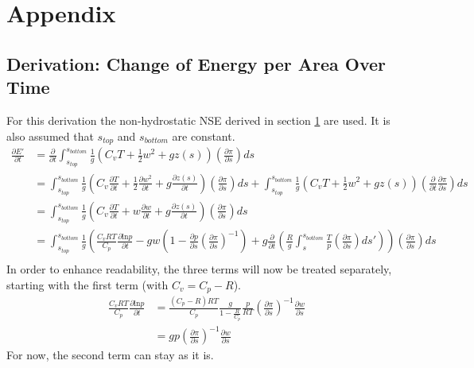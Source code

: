 \chapter{Appendix}
\section{Derivation: Change of Energy per Area Over Time}\label{sec:derivation:dE_dt}
For this derivation the non-hydrostatic NSE derived in section \ref{} are used.
It is also assumed that $s_{top}$ and $s_{bottom}$ are constant.\\
\begin{align*}
\frac{\partial E'}{\partial t} &= \frac{\partial}{\partial t}\int_{s_{top}}^{s_{bottom}} \frac{1}{g}(C_vT+\frac{1}{2}w^2 + gz(s)) \left( \frac{\partial \pi}{\partial s} \right) ds\\
&= \int_{s_{top}}^{s_{bottom}} \frac{1}{g}\left(C_v\frac{\partial T}{\partial t}+\frac{1}{2}\frac{\partial w^2}{\partial t} + g\frac{\partial z(s)}{\partial t}\right) \left( \frac{\partial \pi}{\partial s} \right) ds + \int_{s_{top}}^{s_{bottom}} \frac{1}{g}(C_vT+\frac{1}{2}w^2 + gz(s)) \left( \frac{\partial}{\partial t}\frac{\partial \pi}{\partial s} \right) ds\\
&= \int_{s_{top}}^{s_{bottom}} \frac{1}{g}\left(C_v\frac{\partial T}{\partial t}+w\frac{\partial w}{\partial t} + g\frac{\partial z(s)}{\partial t}\right) \left( \frac{\partial \pi}{\partial s} \right) ds\\
&= \int_{s_{top}}^{s_{bottom}} \frac{1}{g}\left(\frac{C_vRT}{C_p}\frac{\partial \text{ln}p}{\partial t}-gw\left(1 - \frac{\partial p}{\partial s}\left(\frac{\partial \pi}{\partial s}\right)^{-1}\right) + g\frac{\partial}{\partial t}\left(\frac{R}{g}\int _s ^{s_{bottom}} \frac{T}{p}\left(\frac{\partial \pi}{\partial s}\right)ds'\right)\right) \left( \frac{\partial \pi}{\partial s} \right) ds\\
\end{align*}
In order to enhance readability, the three terms will now be treated separately, starting with the first term (with $C_v=C_p-R$).
\begin{align*}
\frac{C_vRT}{C_p}\frac{\partial \text{ln}p}{\partial t} &= \frac{(C_p-R)RT}{C_p}\frac{g}{1- \frac{R}{C_p}} \frac{p}{RT}\left(\frac{\partial \pi}{\partial s}\right)^{-1} \frac{\partial w}{\partial s}\\
&= gp\left(\frac{\partial \pi}{\partial s}\right)^{-1} \frac{\partial w}{\partial s}
\end{align*}
For now, the second term can stay as it is.
